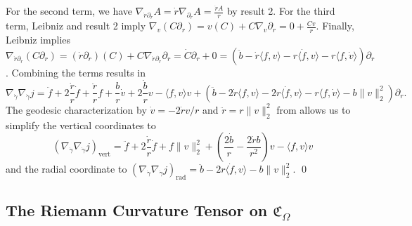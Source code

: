 \documentclass[11pt]{article}
\begin{document}
For the second term, we have $\nabla_{\dot r\partial_r}A = \dot r\nabla_{\partial_r}A = \frac{\dot rA}{r}$ by result 2. For the third term, Leibniz and result 2 imply $\nabla_v(C\partial_r) = v(C) + C\nabla_v\partial_r = 0 + \frac{Cv}{r}$. Finally, Leibniz implies $\nabla_{\dot r\partial_r}(C\partial_r) = (\dot r\partial_r)(C) + C\nabla_{\dot r\partial_r}\partial_r = \dot C \partial_r + 0 = (\ddot b - \dot r\langle f, v\rangle - r\langle \dot f, v\rangle - r \langle f, \dot v\rangle)\partial_r$. Combining the terms results in
\[\nabla_{\dot \gamma}\nabla_{\dot \gamma}j =  \ddot f + 2\frac{\dot r}{r}\dot f + \frac{\ddot r}{r}f+ \frac{b}{r}\dot v + 2\frac{\dot b}{r}v - \langle f,v\rangle v  + \left(\ddot b - 2\dot r \langle f, v\rangle -2r\langle \dot f, v\rangle - r\langle f, \dot v\rangle - b\|v\|_2^2\right)\partial_r.\]
The geodesic characterization by $\dot v = -2\dot rv/r$ and $\ddot r = r\|v\|_2^2$ from  allows us to simplify the vertical coordinates to
\[(\nabla_{\dot \gamma}\nabla_{\dot \gamma}j)_{\text{vert}} = \ddot f + 2\frac{\dot r}{r}\dot f + f\|v\|_2^2  + \left(\frac{2\dot b}{r} - \frac{2 \dot rb}{r^2}\right)v - \langle f,v\rangle v\]
and the radial coordinate to $(\nabla_{\dot \gamma}\nabla_{\dot \gamma}j)_{\text{rad}} = \ddot b - 2r\langle \dot f, v\rangle - b\|v\|_2^2.$
\qed{}


\subsection{The Riemann Curvature Tensor on $\mathfrak{C}_\Omega$}
\end{document}
